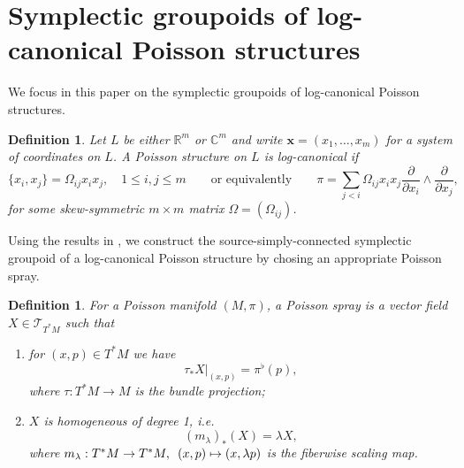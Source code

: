 \documentclass{amsart}
\newtheorem{definition}[theorem]{Definition}
\numberwithin{equation}{section}
\newcommand{\bfx}{{\boldsymbol{x}}}
\newcommand{\cT}{\mathcal{T}}
\newcommand{\CC}{\mathbb{C}}
\newcommand{\RR}{\mathbb{R}}
\begin{document}
\section{Symplectic groupoids of log-canonical Poisson structures}
\label{sec:local}
We focus in this paper on the symplectic groupoids of log-canonical Poisson structures.
\begin{definition} 
  \label{def: logPoisson}
  Let $L$ be either $\RR^m$ or $\CC^m$ and write $\bfx = (x_1, \ldots, x_m)$ for a system of coordinates on $L$.
  A Poisson structure on $L$ is \emph{log-canonical} if
  $$
    \{x_i, x_j\} = \Omega_{ij} x_ix_j, \quad 1 \leq i,j \leq m \qquad \text{or equivalently} \qquad
    \pi = \sum_{j < i} \Omega_{ij} x_ix_j\frac{\partial}{\partial x_i} \wedge \frac{\partial}{\partial x_j},
  $$
  for some skew-symmetric $m\times m$ matrix $\Omega = (\Omega_{ij})$.
\end{definition}

Using the results in \cite{CM11, CMS17}, we construct the source-simply-connected symplectic groupoid of a log-canonical Poisson structure by chosing an appropriate Poisson spray. 
\begin{definition} 
  \cite{CM11}
  For a Poisson manifold $(M, \pi)$, a \emph{Poisson spray} is a vector field $X \in \cT_{T^*M}$ such that
  \begin{enumerate}
    \item for $(x,p) \in T^*M$ we have
      \[\tau_* X|_{(x,p)} = \pi^\flat(p),\]
      where $\tau: T^*M \to M$ is the bundle projection;
    \item $X$ is homogeneous of degree 1, i.e.
      \[(m_\lambda)_*(X) = \lambda X,\]
      where $m_\lambda: T^*M \to T^*M, \enskip (x,p) \mapsto (x,\lambda p)$ is the fiberwise scaling map.
  \end{enumerate}
\end{definition}
\end{document}
